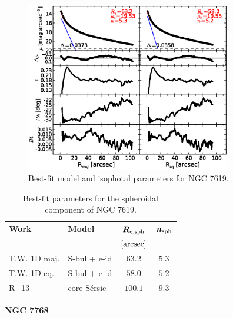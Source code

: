 \documentclass[preprint2]{emulateapj}
\newcommand{\fitfigurewidth}{0.8\textwidth}
\begin{document}
  \begin{figure}[h]
  \begin{center}
  \includegraphics[width=\fitfigurewidth]{images/n7619_1Dfit.eps}
  \caption{Best-fit model and isophotal parameters for NGC 7619.}
  \end{center}
  \end{figure}

  \begin{table}[h]
  \small
  \caption{Best-fit parameters for the spheroidal component of NGC 7619.}
  \begin{center}
  \begin{tabular}{llcc}
  \hline
  {\bf Work} & {\bf Model}   & $\bm R_{\rm e,sph}$    & $\bm n_{\rm sph}$ \\
    &  &  $[\rm arcsec]$ & \\
  \hline
  T.W. 1D maj. & S-bul + e-id & $63.2$  &  $5.3$ \\
  T.W. 1D eq.  & S-bul + e-id & $58.0$  &  $5.2$ \\
  \hline
  R+13      & core-S\'ersic & $100.1$  &  $9.3$ \\
  \hline
  \end{tabular}
  \end{center}
  \label{tab:n7619}
  \end{table}

  \clearpage\newpage\noindent
  {\bf NGC 7768 \\}
\end{document}
